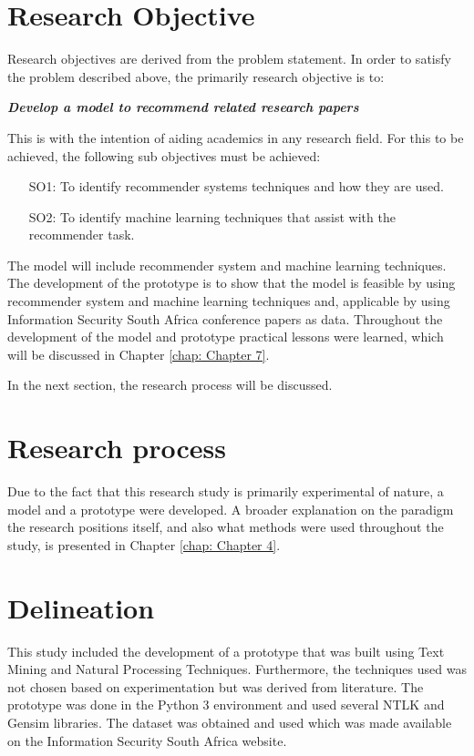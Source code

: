 \section{Research Objective}
Research objectives are derived from the problem statement. In order to satisfy the problem described above, the primarily research objective is to:

\textbf{\textit{Develop a model to recommend related research papers}}

This is with the intention of aiding academics in any research field. For this to be achieved, the following sub objectives must be achieved: 
\begin{itemize}
  \item[SO1:] To identify recommender systems techniques and how they are used.
  \item[SO2:] To identify machine learning techniques that assist with the recommender task.
\end{itemize}

The model will include recommender system and machine learning techniques. The development of the prototype is to show that the model is feasible by using recommender system and machine learning techniques and, applicable by using Information Security South Africa conference papers as data. Throughout the development of the model and prototype practical lessons were learned, which will be discussed in Chapter \ref{chap: Chapter 7}. 

In the next section, the research process will be discussed.

\section{Research process}
Due to the fact that this research study is primarily experimental of nature, a model and a prototype were developed. A broader explanation on the paradigm the research positions itself, and also what methods were used throughout the study, is presented in Chapter \ref{chap: Chapter 4}.

\section{Delineation}
This study included the development of a prototype that was built using Text Mining and Natural Processing Techniques. Furthermore, the techniques used was not chosen based on experimentation but was derived from literature. 
The prototype was done in the Python 3 environment and used several NTLK and Gensim libraries. The dataset was obtained and used which was made available on the Information Security South Africa website.

